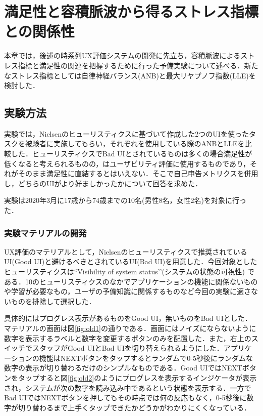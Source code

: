 \chapter{満足性と容積脈波から得るストレス指標との関係性}
\label{chap:pulsewave}

本章では，後述の時系列UX評価システムの開発に先立ち，容積脈波によるストレス指標と満足性の関連を把握するために行った予備実験について述べる．新たなストレス指標としては自律神経バランス(ANB)と最大リヤプノフ指数(LLE)を検討した．

\section{実験方法}

実験では，Nielsenのヒューリスティクスに基づいて作成した2つのUIを使ったタスクを被験者に実施してもらい，それぞれを使用している際のANBとLLEを比較した．ヒューリスティクスでBad UIとされているものは多くの場合満足性が低くなると考えられるものの，はユーザビリティ評価に使用するものであり，それがそのまま満足性に直結するとはいえない．そこで自己申告メトリクスを併用し，どちらのUIがより好ましかったかについて回答を求めた．

実験は2020年3月に17歳から74歳までの10名(男性8名，女性2名)を対象に行った．

\subsection{実験マテリアルの開発}

UX評価のマテリアルとして，Nielsenのヒューリスティクスで推奨されているUI(Good UI)と避けるべきとされているUI(Bad UI)を用意した．今回対象としたヒューリスティクスは``Visibility of system status'’(システムの状態の可視性)\cite{nielsen1990} である．10のヒューリスティクスのなかでアプリケーションの機能に関係ないものや学習が必要なもの，ユーザの予備知識に関係するものなど今回の実験に適さないものを排除して選択した．

具体的にはプログレス表示があるものをGood UI，無いものをBad UIとした．マテリアルの画面は図\ref{fig:old1}の通りである．画面にはノイズにならないように数字を表示するラベルと数字を変更するボタンのみを配置した．また，右上のスイッチでスタッフがGood UIとBad UIを切り替えられるようにした．アプリケーションの機能はNEXTボタンをタップするとランダムで0-5秒後にランダムな数字の表示が切り替わるだけのシンプルなものである．Good UIではNEXTボタンをタップすると図\ref{fig:old2}のようにプログレスを表示するインジケータが表示され，システムが次の数字を読み込み中であるという状態を表示する．一方でBad UIではNEXTボタンを押してもその時点では何の反応もなく，0-5秒後に数字が切り替わるまで上手くタップできたかどうかがわかりにくくなっている．

